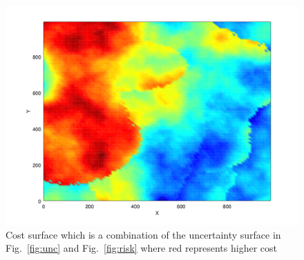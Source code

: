 \documentclass{article}
\begin{document}
\begin{figure}[h!]

    \includegraphics[width=1\columnwidth]{tasefigs/costsurf.png}

    \caption{Cost surface which is a combination of the uncertainty surface
    in Fig.~\ref{fig:unc} and Fig.~\ref{fig:risk} where red represents higher
cost}

    \label{fig:cost}

\end{figure}

 
\end{document}
